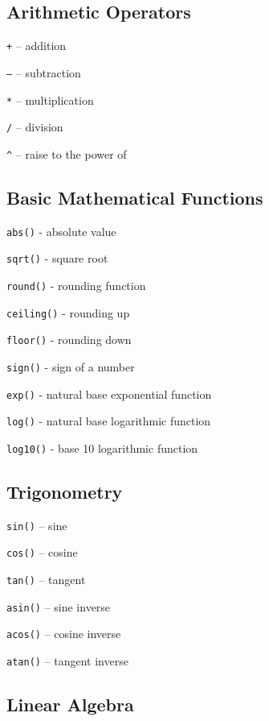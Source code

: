 \documentclass[
]{book}
\begin{document}
\hypertarget{arithmetic-operators}{%
\subsection{Arithmetic Operators}\label{arithmetic-operators}}

\texttt{+} -- addition

\texttt{–} -- subtraction

\texttt{*} -- multiplication

\texttt{/} -- division

\texttt{\^{}} -- raise to the power of

\hypertarget{basic-mathematical-functions}{%
\subsection{Basic Mathematical Functions}\label{basic-mathematical-functions}}

\texttt{abs()} - absolute value

\texttt{sqrt()} - square root

\texttt{round()} - rounding function

\texttt{ceiling()} - rounding up

\texttt{floor()} - rounding down

\texttt{sign()} - sign of a number

\texttt{exp()} - natural base exponential function

\texttt{log()} - natural base logarithmic function

\texttt{log10()} - base 10 logarithmic function

\hypertarget{trigonometry}{%
\subsection{Trigonometry}\label{trigonometry}}

\texttt{sin()} -- sine

\texttt{cos()} -- cosine

\texttt{tan()} -- tangent

\texttt{asin()} -- sine inverse

\texttt{acos()} -- cosine inverse

\texttt{atan()} -- tangent inverse

\hypertarget{linear-algebra}{%
\subsection{Linear Algebra}\label{linear-algebra}}
\end{document}

